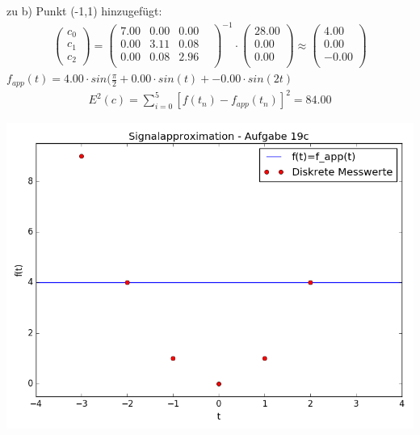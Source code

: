 	zu b) Punkt (-1,1) hinzugefügt: \newline
	\begin{align*}
	\left(\begin{matrix}c_0\\c_1\\c_2\end{matrix}\right) =
	\left(\begin{matrix}
			7.00 & 0.00 & 0.00 & \\
			0.00 & 3.11 & 0.08 & \\
			0.00 & 0.08 & 2.96 & \\
	\end{matrix}\right)^{-1} \cdot
	\left(\begin{matrix}
			28.00\\
			0.00\\
			0.00\\
	\end{matrix}\right) \approx
	\left(\begin{matrix}
			4.00\\
			0.00\\
			-0.00\\
	\end{matrix}\right)
	\end{align*}
	$f_{app}(t) = 4.00 \cdot sin(\frac{\pi}{2} + 0.00 \cdot sin(t) + -0.00 \cdot sin(2t) $\begin{align*}
			E^2(c) = \sum_{i=0}^5 \left[ f(t_n) - f_{app}(t_n)\right]^2 = 84.00
	\end{align*}

	\includegraphics[scale=0.8]{A19c2.png}

